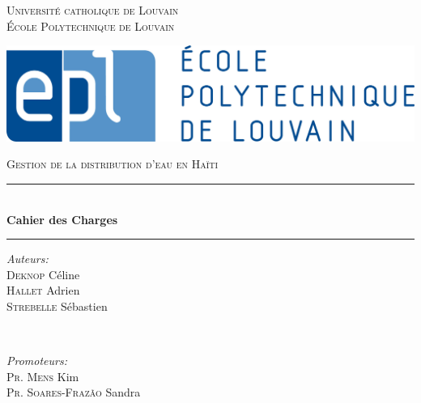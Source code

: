 \documentclass[a4paper, 11pt]{article}
\begin{document}
\begin{titlepage}

\newcommand{\HRule}{\rule{\linewidth}{0.5mm}} %

\center %

\textsc{\LARGE Université catholique de Louvain \\ École Polytechnique de Louvain}

\vfill

\includegraphics[scale=0.45]{Cahier_des_Charges/epl.jpg}

\vfill

\textsc{\large Gestion de la distribution d'eau en Haïti}\\[0.5cm] %


\HRule \\[0.5cm]
{ \huge \bfseries Cahier des Charges}\\[0.3cm] %
\HRule

\vfill


\begin{minipage}[t]{0.4\textwidth}
\begin{flushleft} \large
\emph{Auteurs:}\\
\textsc{Deknop} Céline \\
\textsc{Hallet} Adrien \\
\textsc{Strebelle} Sébastien \\
\end{flushleft}
\end{minipage}
~
\begin{minipage}[t]{0.4\textwidth}
\begin{flushright} \large
\emph{Promoteurs:} \\
\textsc{Pr. Mens} Kim \\
\textsc{Pr. Soares-Frazão} Sandra \\%
\end{flushright}
\end{minipage}


\end{titlepage}
\end{document}
